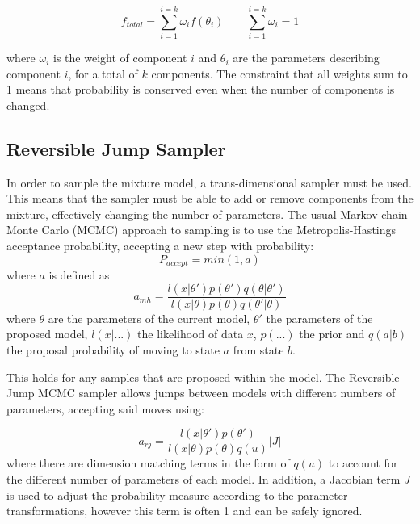 \documentclass[11pt]{article} %
\begin{document}
\begin{equation}\label{eq:mm}
f_{total} = \sum_{i=1}^{i=k}\omega_{i}f(\theta_{i}) \qquad \sum_{i=1}^{i=k}\omega_{i} = 1
\end{equation}

where $\omega_{i}$ is the weight of component $i$ and $\theta_{i}$ are the parameters describing component $i$, for a total of $k$ components. The constraint that all weights sum to 1 means that probability is conserved even when the number of components is changed.

\subsection{Reversible Jump Sampler}\label{rjsampler}
In order to sample the mixture model, a trans-dimensional sampler must be used. This means that the sampler must be able to add or remove components from the mixture, effectively changing the number of parameters. 
The usual Markov chain Monte Carlo (MCMC) approach to sampling is to use the Metropolis-Hastings acceptance probability, accepting a new step with probability:
\begin{equation}\label{eq:ap}
P_{accept} = min(1,a)
\end{equation}
where $a$ is defined as
\begin{equation}\label{eq:mh}
a_{mh} = \frac{l(x|\theta')p(\theta')q(\theta|\theta')}{ l(x|\theta)p(\theta)q(\theta'|\theta)}
\end{equation}
where $\theta$ are the parameters of the current model, $\theta'$ the parameters of the proposed model, $l(x|...)$ the likelihood of data $x$, $p(...)$ the prior and $q(a|b)$ the proposal probability of moving to state $a$ from state $b$.

This holds for any samples that are proposed within the model. The Reversible Jump MCMC sampler allows jumps between models with different numbers of parameters, accepting said moves using:

\begin{equation}\label{eq:rj_a}
a_{rj} = \frac{l(x|\theta')p(\theta')}{l(x|\theta)p(\theta)q(u)}|J|
\end{equation}
where there are dimension matching terms in the form of $q(u)$ to account for the different number of parameters of each model. In addition, a Jacobian term $J$ is used to adjust the probability measure according to the parameter transformations, however this term is often 1 and can be safely ignored.
\end{document}

